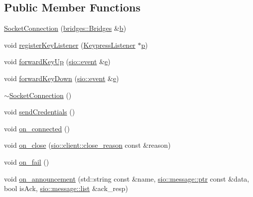 \subsection*{Public Member Functions}
\begin{DoxyCompactItemize}
\item 
\hyperlink{classbridges_1_1game_1_1_socket_connection_a4937228506e9ca92238a9be8c200e6bb}{Socket\+Connection} (\hyperlink{classbridges_1_1_bridges}{bridges\+::\+Bridges} \&\hyperlink{namespacebridges_1_1game_ab9a19c7ab6e2ebac2f95180e21733487a92eb5ffee6ae2fec3ad71c777531578f}{b})
\item 
void \hyperlink{classbridges_1_1game_1_1_socket_connection_a4b4c5a01f9e16622745ba7e157c1bad6}{register\+Key\+Listener} (\hyperlink{classbridges_1_1game_1_1_keypress_listener}{Keypress\+Listener} $\ast$\hyperlink{namespacebridges_1_1game_ab9a19c7ab6e2ebac2f95180e21733487a83878c91171338902e0fe0fb97a8c47a}{p})
\item 
void \hyperlink{classbridges_1_1game_1_1_socket_connection_afa96ab679da2514a571359e877fd540e}{forward\+Key\+Up} (\hyperlink{classsio_1_1event}{sio\+::event} \&\hyperlink{namespacebridges_1_1game_ab9a19c7ab6e2ebac2f95180e21733487ae1671797c52e15f763380b45e841ec32}{e})
\item 
void \hyperlink{classbridges_1_1game_1_1_socket_connection_a39433ad5880f1f01fb62ad79d58c1b56}{forward\+Key\+Down} (\hyperlink{classsio_1_1event}{sio\+::event} \&\hyperlink{namespacebridges_1_1game_ab9a19c7ab6e2ebac2f95180e21733487ae1671797c52e15f763380b45e841ec32}{e})
\item 
\hyperlink{classbridges_1_1game_1_1_socket_connection_ab91626d225be212db188465f73c5de27}{$\sim$\+Socket\+Connection} ()
\item 
void \hyperlink{classbridges_1_1game_1_1_socket_connection_a3529735e80debde503c58dc8c23a61c7}{send\+Credentials} ()
\item 
void \hyperlink{classbridges_1_1game_1_1_socket_connection_a462538c1de9e1840b81a5390ef3632ae}{on\+\_\+connected} ()
\item 
void \hyperlink{classbridges_1_1game_1_1_socket_connection_aa5e6acd2a7ceab61ea1dbcadebc28098}{on\+\_\+close} (\hyperlink{classsio_1_1client_a5c8b6c424134f40b3e9bf488b4961aaf}{sio\+::client\+::close\+\_\+reason} const \&reason)
\item 
void \hyperlink{classbridges_1_1game_1_1_socket_connection_a3cefc3ac9d09c450ad342349e00518d9}{on\+\_\+fail} ()
\item 
void \hyperlink{classbridges_1_1game_1_1_socket_connection_a4da4cee01b392c59f98c57a18c9e9c59}{on\+\_\+announcement} (std\+::string const \&name, \hyperlink{classsio_1_1message_a6340b6fef57e4516eb17928b1885a615}{sio\+::message\+::ptr} const \&data, bool is\+Ack, \hyperlink{classsio_1_1message_1_1list}{sio\+::message\+::list} \&ack\+\_\+resp)

\end{DoxyCompactItemize}
